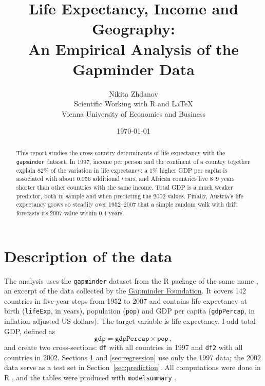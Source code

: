\documentclass[a4paper,12pt]{article}
\title{Life Expectancy, Income and Geography:\\ An Empirical Analysis of the Gapminder Data}
\author{Nikita Zhdanov\\[0.3em]
    \small Scientific Working with R and \LaTeX{}\\
    \small Vienna University of Economics and Business}
\date{\today}
\begin{document}
\maketitle

\begin{abstract}
    \noindent This report studies the cross-country determinants of life expectancy with the \texttt{gapminder} dataset. In 1997, income per person and the continent of a country together explain 82\% of the variation in life expectancy: a 1\% higher GDP per capita is associated with about 0.056 additional years, and African countries live 8--9 years shorter than other countries with the same income. Total GDP is a much weaker predictor, both in sample and when predicting the 2002 values. Finally, Austria's life expectancy grows so steadily over 1952--2007 that a simple random walk with drift forecasts its 2007 value within 0.4 years.
\end{abstract}

\newpage

\tableofcontents

\listoffigures

\listoftables

\newpage

\section{Description of the data}
\label{sec:data}

The analysis uses the \texttt{gapminder} dataset from the R package of the same name \citep{bryan2025gapminder}, an excerpt of the data collected by the \href{https://www.gapminder.org/}{Gapminder Foundation}. It covers 142 countries in five-year steps from 1952 to 2007 and contains life expectancy at birth (\texttt{lifeExp}, in years), population (\texttt{pop}) and GDP per capita (\texttt{gdpPercap}, in inflation-adjusted US dollars). The target variable is life expectancy. I add total GDP, defined as
\begin{equation}
    \texttt{gdp} = \texttt{gdpPercap} \times \texttt{pop} \, ,
    \label{eq:gdp}
\end{equation}
and create two cross-sections: \texttt{df} with all countries in 1997 and \texttt{df2} with all countries in 2002. Sections \ref{sec:data} and \ref{sec:regression} use only the 1997 data; the 2002 data serve as a test set in Section~\ref{sec:prediction}. All computations were done in R \citep{rcore2025}, and the tables were produced with \texttt{modelsummary} \citep{arelbundock2022modelsummary}.
\end{document}

